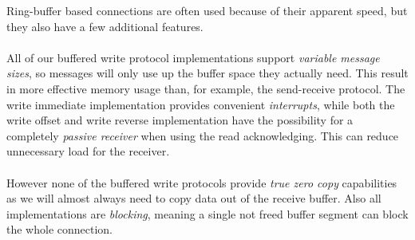 Ring-buffer based connections are often used because of their apparent speed, but they also have a few additional features.


\paragraph{} All of our buffered write protocol implementations support \emph{variable message sizes}, so messages will only
use up the buffer space they actually need. This result in more effective memory usage than, for example, the send-receive protocol.
The write immediate implementation provides convenient \emph{interrupts}, while both the write offset and write reverse 
implementation have the possibility for a completely \emph{passive receiver} when using the read acknowledging. This can
reduce unnecessary load for the receiver.

\paragraph{} However none of the buffered write protocols provide \emph{true zero copy} capabilities as we will almost always
need to copy data out of the receive buffer. Also all implementations are \emph{blocking}, meaning a single not freed buffer
segment can block the whole connection.












